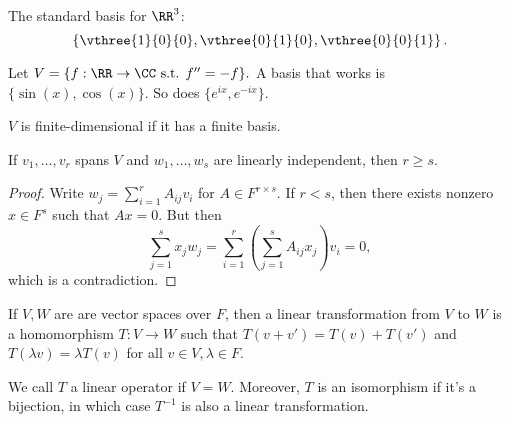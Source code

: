 The standard basis for $\RR^3$: 
\[\left\{\vthree{1}{0}{0}, \vthree{0}{1}{0}, \vthree{0}{0}{1}\right\}.\]

Let $V = \{f: \RR\rightarrow \CC \text{ s.t. } f''=-f\}.$ A basis that works is $\{\sin(x), \cos(x)\}$. So does $\{e^{ix}, e^{-ix}\}$. 

\begin{definition}

$V$ is \ac{finite-dimensional} if it has a finite basis.
\end{definition}

\begin{theorem}
\lemlabel

If $v_1, \hdots, v_r$ spans $V$ and $w_1, \hdots, w_s$ are linearly independent, then $r\geq s$. 
\end{theorem}

\begin{proof}
Write $w_j = \sum_{i=1}^rA_{ij}v_i$ for $A\in F^{r\times s}$. If $r<s$, then there exists nonzero $x\in F^s$ such that $Ax=0$. But then 
\[\sum_{j=1}^sx_jw_j = \sum_{i=1}^r\left(\sum_{j=1}^sA_{ij}x_j\right)v_i = 0,\]
which is a contradiction.
\end{proof}

\begin{definition}

If $V,W$ are are vector spaces over $F$, then a \ac{linear transformation} from $V$ to $W$ is a homomorphism $T:V\rightarrow W$ such that $T(v+v') = T(v)+T(v')$ and $T(\lambda v) = \lambda T(v)$ for all $v\in V, \lambda\in F$. 
\end{definition}

We call $T$ a \ac{linear operator} if $V=W$. Moreover, $T$ is an isomorphism if it's a bijection, in which case $T^{-1}$ is also a linear transformation. 